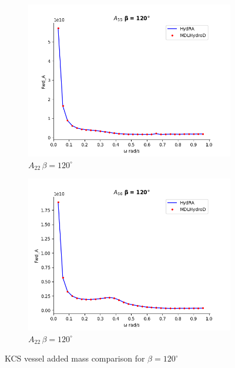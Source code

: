 \begin{figure}[H]
\begin{subfigure}[b]{0.45\textwidth}
        \includegraphics[width=\textwidth]{plots/kvlcc/added_mass/a55.png}
        \caption{$A_{22} \, \beta = 120^{\circ}$}
    \end{subfigure}
    \begin{subfigure}[b]{0.45\textwidth}
        \includegraphics[width=\textwidth]{plots/kvlcc/added_mass/a66.png}
        \caption{$A_{22} \, \beta = 120^{\circ}$}
    \end{subfigure}
    \caption{KCS vessel added mass comparison for $\beta=120^{\circ}$}
    \label{fig:kvlcc_addedmass}
\end{figure}

